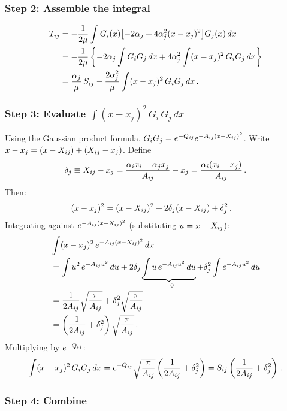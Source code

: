 \subsubsection{Step 2: Assemble the integral}

\begin{align}
  T_{ij} &= -\frac{1}{2\mu}\int G_i(x)\bigl[-2\alpha_j + 4\alpha_j^2(x-x_j)^2\bigr]G_j(x)\,dx\notag\\
  &= -\frac{1}{2\mu}\left\{-2\alpha_j\int G_i G_j\,dx + 4\alpha_j^2\int(x-x_j)^2\,G_i G_j\,dx\right\}\notag\\
  &= \frac{\alpha_j}{\mu}\,S_{ij} - \frac{2\alpha_j^2}{\mu}\int(x-x_j)^2\,G_i G_j\,dx\,.
\end{align}

\subsubsection{Step 3: Evaluate $\int(x-x_j)^2\,G_i\,G_j\,dx$}

Using the Gaussian product formula, $G_i G_j = e^{-Q_{ij}}e^{-A_{ij}(x-X_{ij})^2}$.
Write $x - x_j = (x - X_{ij}) + (X_{ij} - x_j)$. Define
\begin{equation}\label{eq:Delta_j}
  \delta_j \equiv X_{ij} - x_j = \frac{\alpha_i x_i + \alpha_j x_j}{A_{ij}} - x_j
  = \frac{\alpha_i(x_i - x_j)}{A_{ij}}\,.
\end{equation}
Then:
\begin{align}
  (x-x_j)^2 &= (x-X_{ij})^2 + 2\delta_j(x-X_{ij}) + \delta_j^2\,.
\end{align}
Integrating against $e^{-A_{ij}(x-X_{ij})^2}$ (substituting $u = x - X_{ij}$):
\begin{align}
  &\int(x-x_j)^2\,e^{-A_{ij}(x-X_{ij})^2}\,dx\notag\\
  &= \int u^2\,e^{-A_{ij} u^2}\,du + 2\delta_j\underbrace{\int u\,e^{-A_{ij} u^2}\,du}_{=\,0} + \delta_j^2\int e^{-A_{ij} u^2}\,du\notag\\
  &= \frac{1}{2A_{ij}}\sqrt{\frac{\pi}{A_{ij}}} + \delta_j^2\sqrt{\frac{\pi}{A_{ij}}}\notag\\
  &= \left(\frac{1}{2A_{ij}} + \delta_j^2\right)\sqrt{\frac{\pi}{A_{ij}}}\,.
\end{align}
Multiplying by $e^{-Q_{ij}}$:
\begin{equation}
  \int(x-x_j)^2\,G_i G_j\,dx = e^{-Q_{ij}}\sqrt{\frac{\pi}{A_{ij}}}\left(\frac{1}{2A_{ij}}+\delta_j^2\right)
  = S_{ij}\left(\frac{1}{2A_{ij}}+\delta_j^2\right)\,.
\end{equation}

\subsubsection{Step 4: Combine}

